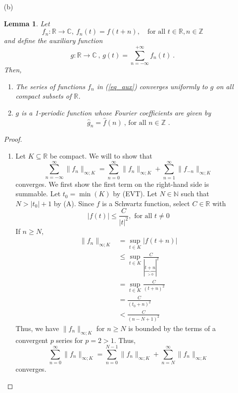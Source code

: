 \documentclass[12pt, reqno]{article}
\newtheorem{lemma}[theorem]{Lemma}
\theoremstyle{definition}
\theoremstyle{remark}
\begin{document}
\begin{itemize}
\vspace{0.1 cm}
\item[(b)] 

\begin{lemma} \label{lm_b}
    Let 
    \begin{equation}
        f_n:\mathbb{R}\to\mathbb{C},~f_n(t)=f(t+n),\quad\text{for all }t\in\mathbb{R}, n\in\mathbb{Z}
    \end{equation}
    and define the auxiliary function 
    \begin{equation} \label{eq_aux}
        g: \mathbb{R} \to \mathbb{C} ~\mbox{, } g(t) = \sum_{n=-\infty}^{+\infty} f_n(t) ~\mbox{.}
    \end{equation}
    Then, 
    \begin{enumerate}
        \item The series of functions $f_n$ in (\ref{eq_aux}) converges uniformly to $g$ on all compact subsets of $\mathbb{R}$.
        \item $g$ is a 1-periodic function whose Fourier coefficients are given by 
        \begin{equation}
            \widehat{g}_n = \widehat{f}(n) ~\mbox{, for all $n \in \mathbb{Z}$ .}
        \end{equation}
    \end{enumerate}
\end{lemma}

\begin{proof}

    \begin{enumerate}


        \item 
        
        Let $K\subseteq \mathbb{R}$ be compact. We will to show that 
        \begin{equation} \label{eq_weier}
            \sum_{n=-\infty}^{\infty}\|f_{n}\|_{\infty;K}=\sum_{n=0}^{\infty}\|f_{n}\|_{\infty;K}+\sum_{n=1}^{\infty}\|f_{-n}\|_{\infty;K}
            \end{equation}
            converges. We first show the first term on the right-hand side is summable. Let $t_{0}=\min(K)$ by (EVT). Let $N\in \mathbb{N}$ such that $N>|t_{0}|+1$ by (A). Since $f$ is a Schwartz function, select $C\in \mathbb{R}$ with $$
            |f(t)|\le \frac{C}{|t|^{2}},\text{ for all }t\ne0
            $$
            If $n\ge N$,
            \begin{align*}
            \|f_{n}\|_{\infty;K}&= \sup_{t\in K}|f(t+n)|\\
            &\le \sup_{t\in K} \frac{C}{|\underbrace{t+n}_{>0}|^{2}} \\
            &= \sup_{t\in K} \frac{C}{(t+n)^{2}}\\
            &= \frac{C}{(t_{0}+n)^{2}}\\
            &< \frac{C}{(n-N+1)^{2}}
            \end{align*}
            Thus, we have $\|f_{n}\|_{\infty;K}$ for $n\ge N$ is bounded by the terms of a convergent $p$ series for $p=2>1$. Thus, $$\sum_{n=0}^{\infty}\|f_{n}\|_{\infty;K}=\sum_{n=0}^{N-1}\|f_{n}\|_{\infty;K}+\sum_{n=N}^{\infty}\|f_{n}\|_{\infty;K}$$
            converges.
            

\end{enumerate}
\end{proof}
\end{itemize}
\end{document}

